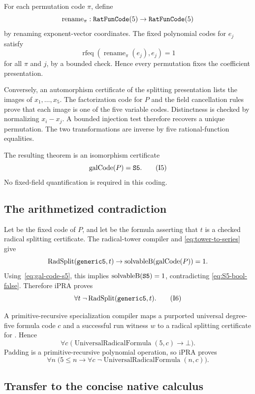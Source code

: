 For each permutation code $\pi$, define
\[
 \operatorname{rename}_\pi:\code{RatFunCode}(5)\to\code{RatFunCode}(5)
\]
by renaming exponent-vector coordinates.  The fixed polynomial codes for
$e_j$ satisfy
\[
 \operatorname{rfeq}(\operatorname{rename}_\pi(e_j),e_j)=1
\]
for all $\pi$ and $j$, by a bounded check.  Hence every permutation fixes the
coefficient presentation.

Conversely, an automorphism certificate of the splitting presentation lists
the images of $x_1,\ldots,x_5$.  The factorization code for $P$ and the field
cancellation rules prove that each image is one of the five variable codes.
Distinctness is checked by normalizing $x_i-x_j$.  A bounded injection test
therefore recovers a unique permutation.  The two transformations are inverse
by five rational-function equalities.

The resulting theorem is an isomorphism certificate
\[
 \operatorname{galCode}(P)=\code{S5}.
 \tag{I5}\label{eq:gal-code-s5}
\]
No fixed-field quantification is required in this coding.

\subsection{The arithmetized contradiction}

Let  be the fixed code of $P$, and let
 be the formula asserting that $t$ is a checked
radical splitting certificate.  The radical-tower compiler and
\eqref{eq:tower-to-series} give
\[
 \operatorname{RadSplit}(\code{generic5},t)
 \to
 \operatorname{solvableB}(\operatorname{galCode}(P))=1.
\]
Using~\eqref{eq:gal-code-s5}, this implies
$\operatorname{solvableB}(\code{S5})=1$, contradicting
\eqref{eq:S5-bool-false}.  Therefore iPRA proves
\[
 \forall t\;\neg\operatorname{RadSplit}(\code{generic5},t).
 \tag{I6}\label{eq:ipra-no-radsplit}
\]

A primitive-recursive specialization compiler  maps a
purported universal degree-five formula code $c$ and a successful run witness
$w$ to a radical splitting certificate for .  Hence
\[
 \forall c\;\bigl(
   \operatorname{UniversalRadicalFormula}(5,c)
   \to\bot\bigr).
 \tag{I7}\label{eq:ipra-abel5}
\]
Padding is a primitive-recursive polynomial operation, so iPRA proves
\[
 \forall n\;\bigl(5\le n\to
   \forall c\;\neg\operatorname{UniversalRadicalFormula}(n,c)\bigr).
 \tag{I8}\label{eq:ipra-abel-all}
\]

\subsection{Transfer to the concise native calculus}

